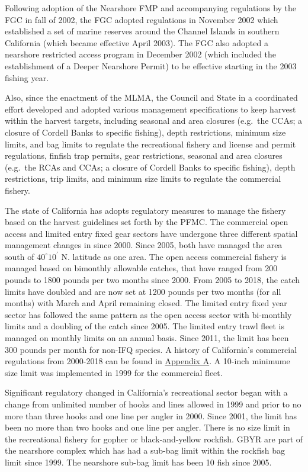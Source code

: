 \documentclass[12pt,]{article}
\begin{document}
Following adoption of the Nearshore FMP and accompanying regulations by
the FGC in fall of 2002, the FGC adopted regulations in November 2002
which established a set of marine reserves around the Channel Islands in
southern California (which became effective April 2003). The FGC also
adopted a nearshore restricted access program in December 2002 (which
included the establishment of a Deeper Nearshore Permit) to be effective
starting in the 2003 fishing year.

Also, since the enactment of the MLMA, the Council and State in a
coordinated effort developed and adopted various management
specifications to keep harvest within the harvest targets, including
seasonal and area closures (e.g.~the CCAs; a closure of Cordell Banks to
specific fishing), depth restrictions, minimum size limits, and bag
limits to regulate the recreational fishery and license and permit
regulations, finfish trap permits, gear restrictions, seasonal and area
closures (e.g.~the RCAs and CCAs; a closure of Cordell Banks to specific
fishing), depth restrictions, trip limits, and minimum size limits to
regulate the commercial fishery.

The state of California has adopts regulatory measures to manage the
fishery based on the harvest guidelines set forth by the PFMC. The
commercial open access and limited entry fixed gear sectors have
undergone three different spatial management changes in since 2000.
Since 2005, both have managed the area south of \(40^\circ 10^\prime\)
N. latitude as one area. The open access commercial fishery is managed
based on bimonthly allowable catches, that have ranged from 200 pounds
to 1800 pounds per two months since 2000. From 2005 to 2018, the catch
limits have doubled and are now set at 1200 pounds per two months (for
all months) with March and April remaining closed. The limited entry
fixed year sector has followed the same pattern as the open access
sector with bi-monthly limits and a doubling of the catch since 2005.
The limited entry trawl fleet is managed on monthly limits on an annual
basis. Since 2011, the limit has been 300 pounds per month for non-IFQ
species. A history of California's commercial regulations from 2000-2018
can be found in
\protect\hyperlink{appendix-a.-californias-commercial-fishery-regulations}{Appendix
A}. A 10-inch minimume size limit was implemented in 1999 for the
commercial fleet.

Significant regulatory changed in California's recreational sector began
with a change from unlimited number of hooks and lines allowed in 1999
and prior to no more than three hooks and one line per angler in 2000.
Since 2001, the limit has been no more than two hooks and one line per
angler. There is no size limit in the recreational fishery for gopher or
black-and-yellow rockfish. GBYR are part of the nearshore complex which
has had a sub-bag limit within the rockfish bag limit since 1999. The
nearshore sub-bag limit has been 10 fish since 2005.
\end{document}
